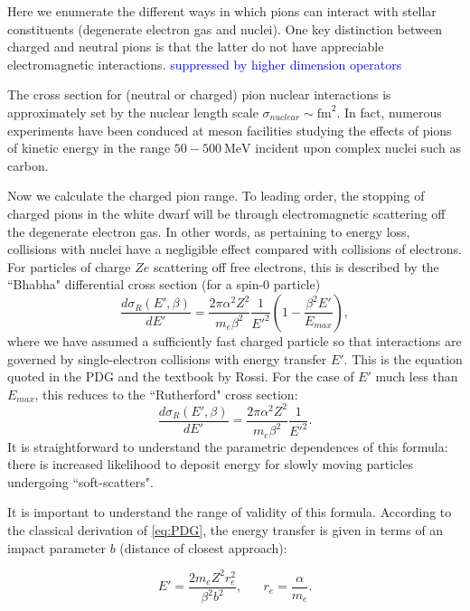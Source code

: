 \documentclass[11 pt, preprint,preprintnumbers,amsmath,amssymb, prd]{revtex4}
\def\r{\right)}
\def\l{\left(}
\begin{document}
Here we enumerate the different ways in which pions can interact with stellar constituents (degenerate electron gas and nuclei). One key distinction between charged and neutral pions is that the latter do not have appreciable electromagnetic interactions. \textcolor{blue}{suppressed by higher dimension operators}

The cross section for (neutral or charged) pion nuclear interactions is approximately set by the nuclear length scale $\sigma_{nuclear} \sim \text{fm}^2$. In fact, numerous experiments have been conduced at meson facilities studying the effects of pions of kinetic energy in the range $50 - 500 ~\text{MeV}$ incident upon complex nuclei such as carbon. 




Now we calculate the charged pion range. To leading order, the stopping of charged pions in the white dwarf will be through electromagnetic scattering off the degenerate electron gas. In other words, as pertaining to energy loss, collisions with nuclei have a negligible effect compared with collisions of electrons. For particles of charge $Ze$ scattering off free electrons, this is described by the ``Bhabha" differential cross section (for a spin-0 particle)
\begin{equation}
\label{eq:PDG}
\frac{d \sigma_R (E', \beta)}{dE'}= \frac{2 \pi  \alpha^2 Z^2}{m_e \beta^2} \frac{1}{E'^2} \l1- \frac{\beta^2 E'}{E_{max}}\r,
\end{equation}
where we have assumed a sufficiently fast charged particle so that interactions are governed by single-electron collisions with energy transfer $E'$. This is the equation quoted in the PDG and the textbook by Rossi. For the case of $E'$ much less than $E_{max}$, this reduces to the ``Rutherford" cross section:
\begin{equation}
\label{eq:PDG}
\frac{d \sigma_R (E', \beta)}{dE'}= \frac{2 \pi  \alpha^2 Z^2}{m_e \beta^2}  \frac{1}{E'^2}. 
\end{equation}
It is straightforward to understand the parametric dependences of this formula: there is increased likelihood to deposit energy for slowly moving particles undergoing ``soft-scatters".  

It is important to understand the range of validity of this formula. According to the classical derivation of \ref{eq:PDG}, the energy transfer is given in terms of an impact parameter $b$ (distance of closest approach):

\begin{equation}
E' = \frac{2 m_e Z^2 r_e^2}{\beta^2 b^2}, \hspace{20pt} r_e = \frac{\alpha}{m_e}. 
\end{equation}
\end{document}
